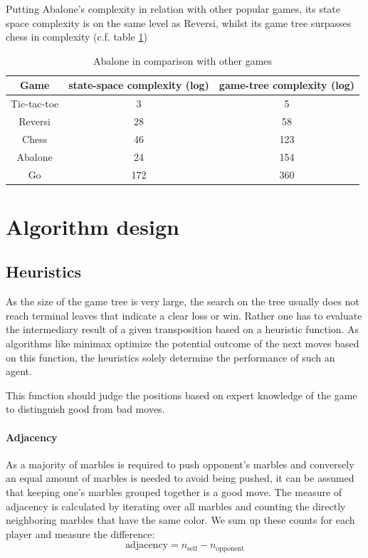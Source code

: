 \documentclass{llncs}
\begin{document}
Putting Abalone's complexity in relation with other popular games, its state space complexity is on the same level as Reversi, whilst its game tree surpasses chess in complexity (c.f. table \ref{complexity_table})

\begin{table}
	\begin{center}
		\begin{tabular}{ | c | c | c | }
			\hline
			Game        & state-space complexity (log) & game-tree complexity (log) \\
			\hline
			Tic-tac-toe & 3                            & 5                          \\
			\hline
			Reversi     & 28                           & 58                         \\
			\hline
			Chess       & 46                           & 123                        \\
			\hline
			Abalone     & 24                           & 154                        \\
			\hline
			Go          & 172                          & 360                        \\
			\hline
		\end{tabular}
	\end{center}
	\caption{Abalone in comparison with other games \cite{chorus_implementing_2009}}
	\label{complexity_table}
\end{table}


\section{Algorithm design}


\subsection{Heuristics}
As the size of the game tree is very large, the search on the tree usually does not reach terminal leaves that indicate a clear loss or win. Rather one has to evaluate the intermediary result of a given transposition based on a heuristic function. As algorithms like minimax optimize the potential outcome of the next moves based on this function, the heuristics solely determine the performance of such an agent.

This function should judge the positions based on expert knowledge of the game to distinguish good from bad moves.

\paragraph{Adjacency}
As a majority of marbles is required to push opponent's marbles and conversely an equal amount of marbles is needed to avoid being pushed, it can be assumed that keeping one's marbles grouped together is a good move. The measure of adjacency is calculated by iterating over all marbles and counting the directly neighboring marbles that have the same color. We sum up these counts for each player and measure the difference:
$$ \text{adjacency} = n_{\text{self}} - n_{\text{opponent}} $$
\end{document}
